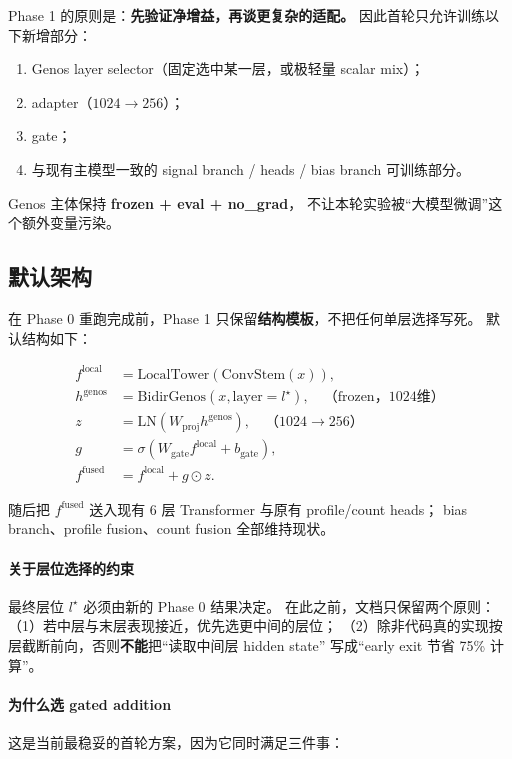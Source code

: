 \documentclass[11pt,a4paper]{ctexart}
\begin{document}
Phase 1 的原则是：\textbf{先验证净增益，再谈更复杂的适配。}
因此首轮只允许训练以下新增部分：

\begin{enumerate}[leftmargin=2em]
  \item Genos layer selector（固定选中某一层，或极轻量 scalar mix）；
  \item adapter（$1024 \rightarrow 256$）；
  \item gate；
  \item 与现有主模型一致的 signal branch / heads / bias branch 可训练部分。
\end{enumerate}

Genos 主体保持 \textbf{frozen + eval + no\_grad}，
不让本轮实验被“大模型微调”这个额外变量污染。

\subsection{默认架构}

在 Phase 0 重跑完成前，Phase 1 只保留\textbf{结构模板}，不把任何单层选择写死。
默认结构如下：

\begin{align}
f^{\mathrm{local}} &= \mathrm{LocalTower}(\mathrm{ConvStem}(x)), \\
h^{\mathrm{genos}} &= \mathrm{BidirGenos}(x, \mathrm{layer}=l^\star), \quad \text{（frozen，1024维）}\\
z &= \mathrm{LN}\!\left(W_{\mathrm{proj}} h^{\mathrm{genos}}\right), \quad \text{（$1024 \rightarrow 256$）}\\
g &= \sigma\!\left(W_{\mathrm{gate}} f^{\mathrm{local}} + b_{\mathrm{gate}}\right), \\
f^{\mathrm{fused}} &= f^{\mathrm{local}} + g \odot z.
\end{align}

随后把 $f^{\mathrm{fused}}$ 送入现有 6 层 Transformer 与原有 profile/count heads；
bias branch、profile fusion、count fusion 全部维持现状。

\paragraph{关于层位选择的约束}
最终层位 $l^\star$ 必须由新的 Phase 0 结果决定。
在此之前，文档只保留两个原则：
（1）若中层与末层表现接近，优先选更中间的层位；
（2）除非代码真的实现按层截断前向，否则\textbf{不能}把“读取中间层 hidden state”
写成“early exit 节省 75\% 计算”。

\paragraph{为什么选 gated addition}
这是当前最稳妥的首轮方案，因为它同时满足三件事：
\end{document}
